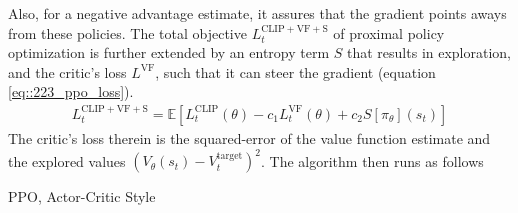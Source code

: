 Also, for a negative advantage estimate, it assures that the gradient points aways from these policies. The total objective $L_t^{\text{CLIP}+\text{VF}+\text{S}}$ of proximal policy optimization is further extended by an entropy term $S$ that results in exploration, and the critic's loss $L^\text{VF}$, such that it can steer the gradient (equation \ref{eq::223_ppo_loss}).
\begin{align}
	L_t^{\text{CLIP}+\text{VF}+\text{S}} = \mathbb{E}\left[L_t^\text{CLIP}(\theta)-c_1L_t^\text{VF}(\theta)+c_2S\left[\pi_\theta\right](s_t)\right]
	\label{eq::223_ppo_loss}
\end{align}
The critic's loss therein is the squared-error of the value function estimate and the explored values $(V_\theta(s_t)-V^\text{target}_t)^2$. The algorithm then runs as follows
\begin{algorithm}
	\SetAlgoLined
	\caption{PPO, Actor-Critic Style}
	\label{alg::225_ac}
\end{algorithm}